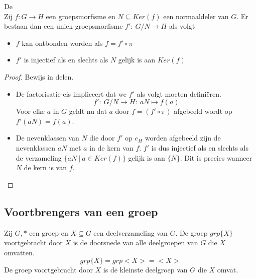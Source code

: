 \documentclass[main.tex]{subfiles}
\begin{document}
\begin{st}
  \label{st:factorisatiestelling}
  \examen
  De \\
  Zij $f: G\rightarrow H$ een groepsmorfisme en $N\subseteq Ker(f)$ een normaaldeler van $G$.
  Er bestaan dan een uniek groepsmorfisme $f':\ G/N \rightarrow H$ als volgt
  \begin{itemize}
  \item $f$ kan ontbonden worden als $f=f'\circ \pi$
  \item $f'$ is injectief als en slechts als $N$ gelijk is aan $Ker(f)$
  \end{itemize}
  \begin{figure}[H]
    \centering
  \end{figure}
  \begin{proof}
    Bewijs in delen.
    \begin{itemize}
    \item 
      De factorisatie-eis impliceert dat we $f'$ als volgt moeten defini\"eren.
      \[ f':\ G/N \rightarrow H:\ aN \mapsto f(a) \]
      Voor elke $a$ in $G$ geldt nu dat $a$ door $f= (f' \circ \pi)$ afgebeeld wordt op $f'(aN) = f(a)$.
    \item 
      De nevenklassen van $N$ die door $f'$ op $e_{H}$ worden afgebeeld
      zijn de nevenklassen $aN$ met $a$ in de kern van $f$.  $f'$ is dus
      injectief als en slechts als de verzameling $\{ aN \ |\ a \in
      Ker(f) \}$ gelijk is aan $\{ N \}$.
      Dit is precies wanneer $N$ de kern is van $f$.
    \end{itemize}
  \end{proof}
\end{st}

\subsection{Voortbrengers van een groep}

\begin{de}
  Zij $G,*$ een groep en $X \subseteq G$ een deelverzameling van $G$.
  De groep $grp\{X\}$ voortgebracht door $X$ is de doorsnede van alle deelgroepen van $G$ die $X$ omvatten. 
  \[ grp\{X\} = grp<X> = <X> \]
  De groep voortgebracht door $X$ is de kleinste deelgroep van $G$ die $X$ omvat.
\end{de}
\end{document}
